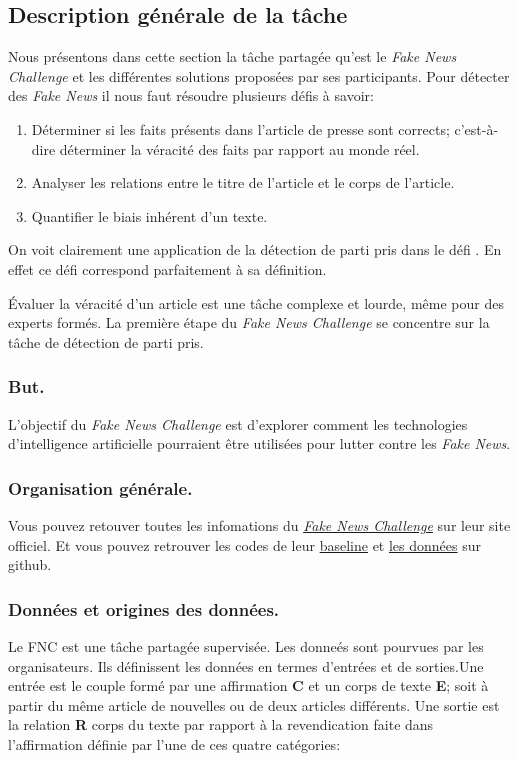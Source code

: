 \documentclass[11pt,a4paper,oldfontcommands]{memoir}
\begin{document}
\subsection{Description générale de la tâche}
Nous présentons dans cette section la tâche partagée qu'est le \textit{Fake News Challenge} et les différentes solutions proposées par ses participants.
Pour détecter des \textit{Fake News} il nous faut résoudre plusieurs défis à savoir:
\begin{enumerate}
 \item Déterminer si les faits présents dans l'article de presse sont corrects; c'est-à-dire déterminer la véracité des faits par rapport au monde réel.
 \item Analyser les relations entre le titre de l'article et le corps de l'article.
 \item Quantifier le biais inhérent d'un texte.
\end{enumerate}
On voit clairement une application de la détection de parti pris dans le défi .
En effet ce défi correspond parfaitement à sa définition.

Évaluer la véracité d'un article est une tâche complexe et lourde, même pour des experts formés.
La première étape du \textit{Fake News Challenge} se concentre sur la tâche de détection de parti pris.
\subsubsection{But.}
L'objectif du \textit{Fake News Challenge} est d'explorer comment les technologies
d'intelligence artificielle pourraient être utilisées pour lutter contre les
\textit{Fake News}.
\subsubsection{Organisation générale.}
Vous pouvez retouver toutes les infomations du \href{http://www.fakenewschallenge.org/}{\textit{Fake News Challenge}} sur leur site officiel.
Et vous pouvez retrouver les codes de leur \href{https://github.com/FakeNewsChallenge/fnc-1-baseline}{baseline} et \href{https://github.com/FakeNewsChallenge/fnc-1}{les données} sur github.


\subsubsection{Données et origines des données.}
Le FNC est une tâche partagée supervisée.
Les donneés sont pourvues par les organisateurs.
Ils définissent les données en termes d'entrées et de sorties.Une entrée est le couple formé par une affirmation \textbf{C} et un corps de texte \textbf{E}; soit à partir du même article de nouvelles ou de deux articles différents.
Une sortie est la relation \textbf{R} corps du texte par rapport à la revendication faite dans l'affirmation définie par l'une de ces quatre catégories:
\end{document}
